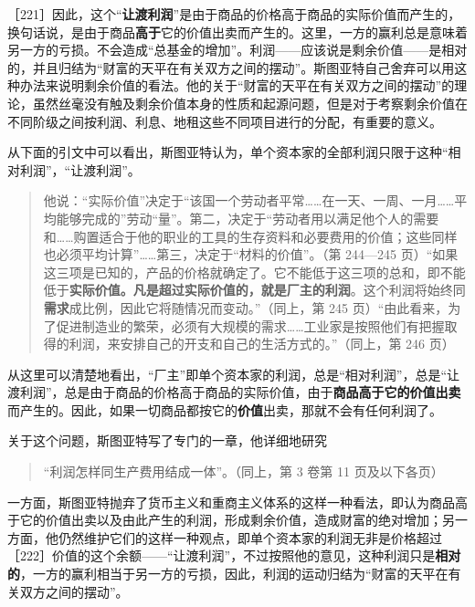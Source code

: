 ［221］因此，这个“\textbf{让渡利润}”是由于商品的价格高于商品的实际价值而产生的，换句话说，是由于商品\textbf{高于}它的价值出卖而产生的。这里，一方的赢利总是意味着另一方的亏损。不会造成“总基金的增加”。利润——应该说是剩余价值——是相对的，并且归结为“财富的天平在有关双方之间的摆动”。斯图亚特自己舍弃可以用这种办法来说明剩余价值的看法。他的关于“财富的天平在有关双方之间的摆动”的理论，虽然丝毫没有触及剩余价值本身的性质和起源问题，但是对于考察剩余价值在不同阶级之间按利润、利息、地租这些不同项目进行的分配，有重要的意义。


从下面的引文中可以看出，斯图亚特认为，单个资本家的全部利润只限于这种“相对利润”，“让渡利润”。

\begin{quote}他说：“实际价值”决定于“该国一个劳动者平常……在一天、一周、一月……平均能够完成的”劳动“量”。第二，决定于“劳动者用以满足他个人的需要和……购置适合于他的职业的工具的生存资料和必要费用的价值；这些同样也必须平均计算”……第三，决定于“材料的价值”。（第 244—245 页）“如果这三项是已知的，产品的价格就确定了。它不能低于这三项的总和，即不能低于\textbf{实际价值。凡是超过实际价值的，就是厂主的利润}。这个利润将始终同\textbf{需求}成比例，因此它将随情况而变动。”（同上，第 245 页）“由此看来，为了促进制造业的繁荣，必须有大规模的需求……工业家是按照他们有把握取得的利润，来安排自己的开支和自己的生活方式的。”（同上，第 246 页）\end{quote}

从这里可以清楚地看出，“厂主”即单个资本家的利润，总是“相对利润”，总是“让渡利润”，总是由于商品的价格高于商品的实际价值，由于\textbf{商品高于它的价值出卖}而产生的。因此，如果一切商品都按它的\textbf{价值}出卖，那就不会有任何利润了。

关于这个问题，斯图亚特写了专门的一章，他详细地研究

\begin{quote}“利润怎样同生产费用结成一体”。（同上，第 3 卷第 11 页及以下各页）\end{quote}

一方面，斯图亚特抛弃了货币主义和重商主义体系的这样一种看法，即认为商品高于它的价值出卖以及由此产生的利润，形成剩余价值，造成财富的绝对增加；另一方面，他仍然维护它们的这样一种观点，即单个资本家的利润无非是价格超过［222］价值的这个余额——“让渡利润”，不过按照他的意见，这种利润只是\textbf{相对的}，一方的赢利相当于另一方的亏损，因此，利润的运动归结为“财富的天平在有关双方之间的摆动”。

